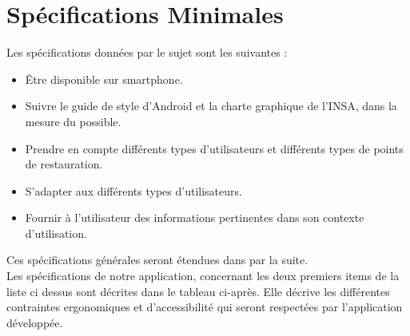 \section{Spécifications Minimales}

    Les spécifications données par le sujet sont les suivantes : \\
    
\begin{itemize}
    \item[\textbullet] Être disponible sur smartphone.
    \item[\textbullet] Suivre le guide de style d'Android et la charte graphique de l'INSA, dans la mesure du possible.
    \item[\textbullet] Prendre en compte différents types d'utilisateurs et différents types de points de restauration.
    \item[\textbullet] S'adapter aux différents types d'utilisateurs.
    \item[\textbullet] Fournir à l'utilisateur des informations pertinentes dans son contexte d'utilisation. \\
\end{itemize}

    Ces spécifications générales seront étendues dans par la suite. \\
    
    Les spécifications de notre application, concernant les deux premiers items de la liste ci dessus sont décrites dans le tableau ci-après. Elle décrive les différentes contraintes ergonomiques et d'accessibilité qui seront respectées par l'application développée. 

